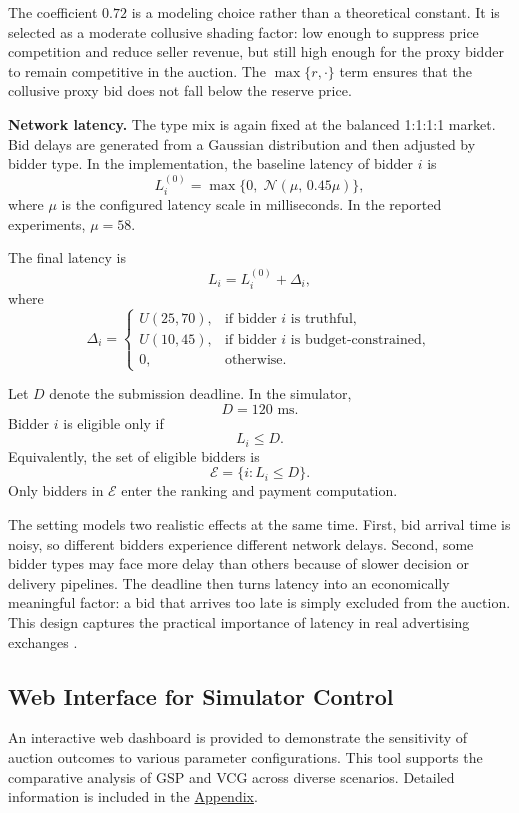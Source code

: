 \documentclass[12pt,a4paper]{article}
\begin{document}
The coefficient $0.72$ is a modeling choice rather than a theoretical constant. It is selected as a moderate collusive shading factor: low enough to suppress price competition and reduce seller revenue, but still high enough for the proxy bidder to remain competitive in the auction. The $\max\{r,\cdot\}$ term ensures that the collusive proxy bid does not fall below the reserve price.

\textbf{Network latency.} The type mix is again fixed at the balanced 1:1:1:1 market. Bid delays are generated from a Gaussian distribution and then adjusted by bidder type. In the implementation, the baseline latency of bidder $i$ is
\[
L_i^{(0)} = \max\{0,\; \mathcal{N}(\mu,\, 0.45\mu)\},
\]
where $\mu$ is the configured latency scale in milliseconds. In the reported experiments, $\mu = 58$.

The final latency is
\[
L_i = L_i^{(0)} + \Delta_i,
\]
where
\[
\Delta_i =
\begin{cases}
U(25,70), & \text{if bidder } i \text{ is truthful},\\[4pt]
U(10,45), & \text{if bidder } i \text{ is budget-constrained},\\[4pt]
0, & \text{otherwise}.
\end{cases}
\]

Let $D$ denote the submission deadline. In the simulator,
\[
D = 120 \text{ ms}.
\]
Bidder $i$ is eligible only if
\[
L_i \le D.
\]
Equivalently, the set of eligible bidders is
\[
\mathcal{E} = \{i : L_i \le D\}.
\]
Only bidders in $\mathcal{E}$ enter the ranking and payment computation. 

The setting models two realistic effects at the same time. First, bid arrival time is noisy, so different bidders experience different network delays. Second, some bidder types may face more delay than others because of slower decision or delivery pipelines. The deadline then turns latency into an economically meaningful factor: a bid that arrives too late is simply excluded from the auction. This design captures the practical importance of latency in real advertising exchanges \cite{aqeel2020}.

\subsection{Web Interface for Simulator Control}
An interactive web dashboard is provided to demonstrate the sensitivity of auction outcomes to various parameter configurations. This tool supports the comparative analysis of GSP and VCG across diverse scenarios. Detailed information is included in the \hyperref[sec:appendix]{Appendix}.
\end{document}
